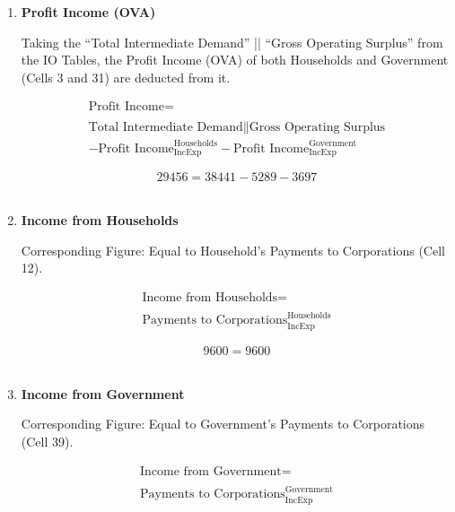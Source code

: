 \begin{enumerate}
\item \textbf {Profit Income (OVA)}

Taking the ``Total Intermediate Demand'' || ``Gross Operating Surplus'' from the IO Tables, the Profit Income (OVA) of both Households and Government (Cells 3 and 31) are deducted from it. \cite{ScotGov2013a,ONS2011b}

\begin{equation}
\begin{split}
\text{Profit Income} =  \\ \\
\text{Total Intermediate Demand}\|\text{Gross Operating Surplus}\\
-\text{Profit Income}^\text{Households}_\text{IncExp}-\text{Profit Income}^\text{Government}_\text{IncExp}
\end{split} \label{eq:2.5.23}
\end{equation}

\begin{equation} \nonumber
29456 = 38441-5289-3697
\end{equation}\\


\item \textbf {Income from Households}

Corresponding Figure: Equal to Household's Payments to Corporations (Cell 12).

\begin{equation}
\begin{split}
\text{Income from Households} =  \\ \\
\text{Payments to Corporations}^\text{Households}_\text{IncExp}
\end{split} \label{eq:2.5.24}
\end{equation}

\begin{equation} \nonumber
9600 = 9600
\end{equation}\\


\item \textbf {Income from Government}

Corresponding Figure: Equal to Government's Payments to Corporations (Cell 39).

\begin{equation}
\begin{split}
\text{Income from Government} =  \\ \\
\text{Payments to Corporations}^\text{Government}_\text{IncExp}
\end{split} \label{eq:2.5.25}
\end{equation}


\end{enumerate}
